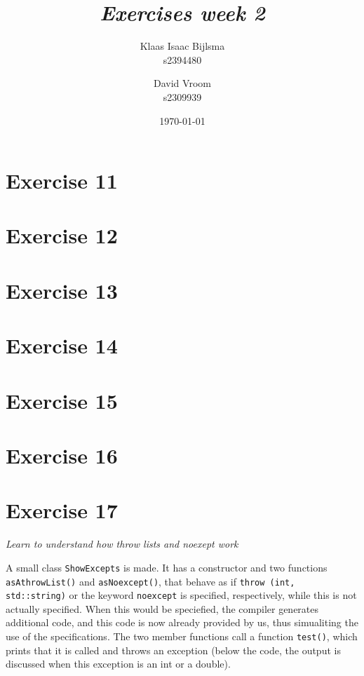 \documentclass[12pt]{article}
\title{\itshape Exercises week 2}
\author{
	Klaas Isaac Bijlsma \\ s2394480
	\and
	David Vroom \\ s2309939
}
\date{\today}
\newcommand{\desc}[1]{\textit{#1} \vspace{1em}}
\begin{document}
\maketitle

\section*{Exercise 11}
\desc{}


\clearpage
\section*{Exercise 12}
\desc{}

\clearpage
\section*{Exercise 13}
\desc{}

\clearpage
\section*{Exercise 14}
\desc{}


\clearpage
\section*{Exercise 15}
\desc{}

\clearpage
\section*{Exercise 16}
\desc{}


\clearpage
\section*{Exercise 17}
\desc{Learn to understand how throw lists and noexept work}

A small class \texttt{ShowExcepts} is made. It has a constructor and two functions \texttt{asAthrowList()} and \texttt{asNoexcept()}, that behave as if \texttt{throw (int, std::string)} or the keyword \texttt{noexcept} is specified, respectively, while this is not actually specified. When this would be speciefied, the compiler generates additional code, and this code is now already provided by us, thus simualiting the use of the specifications. 
The two member functions call a function \texttt{test()}, which prints that it is called and throws an exception (below the code, the output is discussed when this exception is an int or a double). 
\end{document}

